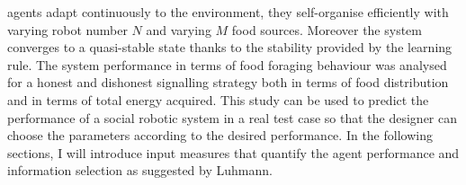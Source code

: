 agents adapt continuously to the environment, they self-organise efficiently
with varying robot number $N$ and varying $M$ food sources.
Moreover the system converges to a quasi-stable state thanks to the stability
provided by the learning rule.
The system performance in terms of food foraging behaviour was analysed for 
a honest and dishonest signalling strategy both in terms of food distribution
and in terms of total energy acquired.
This study can be used to predict the performance of a social robotic system in
a real test case so that the designer can choose the parameters according to the
desired performance.
In the following sections, I will introduce input measures that quantify the
agent performance and information selection as suggested by Luhmann. 





